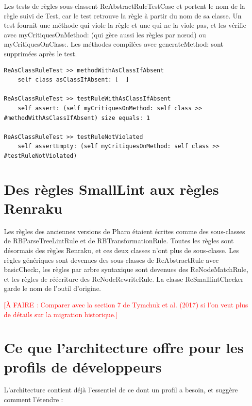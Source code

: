 \documentclass[11pt,a4paper]{report}
\newcommand{\todo}[1]{\textcolor{red}{[À FAIRE : #1]}}
\begin{document}
Les tests de règles sous-classent ReAbstractRuleTestCase et portent le nom de la règle suivi de Test, car le test retrouve la règle à partir du nom de sa classe. Un test fournit une méthode qui viole la règle et une qui ne la viole pas, et les vérifie avec myCritiquesOnMethod: (qui gère aussi les règles par nœud) ou myCritiquesOnClass:. Les méthodes compilées avec generateMethod: sont supprimées après le test.

\begin{lstlisting}
ReAsClassRuleTest >> methodWithAsClassIfAbsent
	self class asClassIfAbsent: [  ]

ReAsClassRuleTest >> testRuleWithAsClassIfAbsent
	self assert: (self myCritiquesOnMethod: self class >> #methodWithAsClassIfAbsent) size equals: 1

ReAsClassRuleTest >> testRuleNotViolated
	self assertEmpty: (self myCritiquesOnMethod: self class >> #testRuleNotViolated)
\end{lstlisting}

\section{Des règles SmallLint aux règles Renraku}
Les règles des anciennes versions de Pharo étaient écrites comme des sous-classes de RBParseTreeLintRule et de RBTransformationRule. Toutes les règles sont désormais des règles Renraku, et ces deux classes n’ont plus de sous-classe. Les règles génériques sont devenues des sous-classes de ReAbstractRule avec basicCheck:, les règles par arbre syntaxique sont devenues des ReNodeMatchRule, et les règles de réécriture des ReNodeRewriteRule. La classe ReSmalllintChecker garde le nom de l’outil d’origine.

\todo{Comparer avec la section 7 de Tymchuk et al. (2017) si l’on veut plus de détails sur la migration historique.}

\section{Ce que l’architecture offre pour les profils de développeurs}
L’architecture contient déjà l’essentiel de ce dont un profil a besoin, et suggère comment l’étendre :
\end{document}
